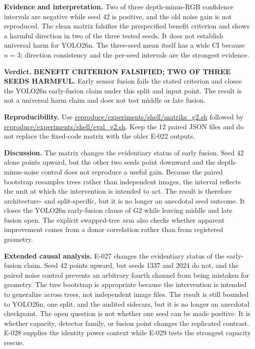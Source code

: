 \documentclass[preprint,12pt]{elsarticle}
\newcommand{\pathcode}[1]{\scriptsize\url{#1}}
\begin{document}
\textbf{Evidence and interpretation.} Two of three depth-minus-RGB
confidence intervals are negative while seed 42 is positive, and the old
noise gain is not reproduced. The clean matrix falsifies the prespecified
benefit criterion and shows a harmful direction in two of the three tested
seeds. It does not establish universal harm for YOLO26n. The three-seed mean
itself has a wide CI because \(n=3\); direction consistency and the per-seed
intervals are the strongest evidence.

\textbf{Verdict.} \textbf{BENEFIT CRITERION FALSIFIED; TWO OF THREE SEEDS
HARMFUL.} Early sensor fusion fails the stated criterion and closes
the YOLO26n early-fusion claim under this split and input point. The result is
not a universal harm claim and does not test middle or late fusion.

\textbf{Reproducibility.} Use \pathcode{reproduce/experiments/shell/matriks_g2.sh}
followed by \pathcode{reproduce/experiments/shell/eval_g2.sh}. Keep the 12
paired JSON files and do not replace
the fixed-code matrix with the older E-022 outputs.

\textbf{Discussion.} The matrix changes the evidentiary status of early
fusion. Seed 42 alone points upward, but the other two seeds point downward
and the depth-minus-noise control does not reproduce a useful gain. Because
the paired bootstrap resamples trees rather than independent images, the
interval reflects the unit at which the intervention is intended to act. The
result is therefore architecture- and split-specific, but it is no longer an
anecdotal seed outcome. It closes the YOLO26n early-fusion clause of G2 while
leaving middle and late fusion open. The explicit swapped-tree arm also
checks whether apparent improvement comes from a donor correlation rather
than from registered geometry.

\textbf{Extended causal analysis.} E-027 changes the evidentiary status of
the early-fusion claim. Seed 42 points upward, but seeds 1337 and 2024 do not,
and the paired noise control prevents an arbitrary fourth channel from being
mistaken for geometry. The tree bootstrap is appropriate because the
intervention is intended to generalize across trees, not independent image
files. The result is still bounded to YOLO26n, one split, and the audited
sidecars, but it is no longer an anecdotal checkpoint. The open question is
not whether one seed can be made positive. It is whether capacity, detector
family, or fusion point changes the replicated contrast. E-028 supplies the
identity power context while E-029 tests the strongest capacity rescue.
\end{document}
